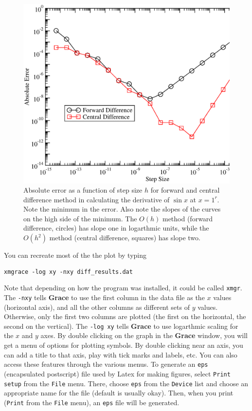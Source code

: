 \documentclass{article}
\begin{document}
\begin{figure}[h]
\includegraphics[width=\textwidth]{diff_results}
\caption{
Absolute error as a function of step size $h$ for forward and central difference method
in calculating the derivative of $\sin{x}$ at $x=1^r$.
Note the minimum in the error.  Also note the slopes of the curves on the high
side of the minimum.  The $O(h)$ method (forward difference, circles) has slope
one in logarthmic units, while the
$O(h^2)$ method (central difference, squares) has slope two.
}
\label{diff_results}
\end{figure}

You can recreate most of the the plot by typing

\begin{verbatim}
xmgrace -log xy -nxy diff_results.dat
\end{verbatim}


Note that depending on how the program was installed, it could be called  {\tt xmgr}.
The {\tt -nxy} tells {\bf Grace} to use the first column in the data file as the $x$ values (horizontal axis),
and all the other columns as different sets of $y$ values.  Otherwise, only the first two columns are
plotted (the first on the horizontal, the second on the vertical).  The {\tt -log xy} tells {\bf Grace} to use logarthmic scaling for the $x$ and $y$ axes. 
By double clicking on the graph in the {\bf Grace} window, you will get a menu of options for 
plotting symbols.  By double clicking near an axis, you can add a title to that axis, play with tick marks
and labels, etc.  You can also
access these features through the various menus.  To generate an {\tt eps} (encapsulated postscript) file
used by Latex for making figures, select {\tt Print setup} from the {\tt File} menu.  There, choose {\tt eps}
from the {\tt Device} list and choose an appropriate name for the file (default is usually okay).  Then, when you
print ({\tt Print} from the {\tt File} menu), an {\tt eps} file will be generated.
\\
\end{document}
